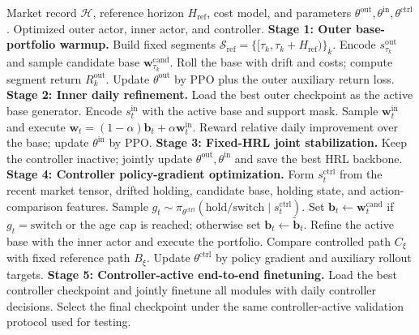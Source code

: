 \documentclass[letterpaper]{article} %
\newcommand{\algsmall}{\footnotesize}
\begin{document}
\begin{algorithm}[t]
\caption{End-to-End Staged Training of \textit{CMTFlow}}
\label{alg:cmtflow_training}
\algsmall
\begin{algorithmic}[1]
\REQUIRE Market record \(\mathcal{H}\), reference horizon \(H_{\mathrm{ref}}\), cost model, and parameters \(\theta^{\mathrm{out}},\theta^{\mathrm{in}},\theta^{\mathrm{ctrl}}\).
\ENSURE Optimized outer actor, inner actor, and controller.
\STATE \textbf{Stage 1: Outer base-portfolio warmup.}
\STATE Build fixed segments \(\mathcal{S}_{\mathrm{ref}}=\{[\tau_k,\tau_k+H_{\mathrm{ref}})\}_k\).
\STATE Encode \(s^{\mathrm{out}}_{\tau_k}\) and sample candidate base \(\mathbf{w}^{\mathrm{cand}}_{\tau_k}\).
\STATE Roll the base with drift and costs; compute segment return \(R^{\mathrm{out}}_k\).
\STATE Update \(\theta^{\mathrm{out}}\) by PPO plus the outer auxiliary return loss.
\ENDFOR
\STATE \textbf{Stage 2: Inner daily refinement.}
\STATE Load the best outer checkpoint as the active base generator.
\STATE Encode \(s^{\mathrm{in}}_t\) with the active base and support mask.
\STATE Sample \(\mathbf{w}^{\mathrm{in}}_t\) and execute \(\mathbf{w}_t=(1-\alpha)\mathbf{b}_t+\alpha\mathbf{w}^{\mathrm{in}}_t\).
\STATE Reward relative daily improvement over the base; update \(\theta^{\mathrm{in}}\) by PPO.
\ENDFOR
\STATE \textbf{Stage 3: Fixed-HRL joint stabilization.}
\STATE Keep the controller inactive; jointly update \(\theta^{\mathrm{out}},\theta^{\mathrm{in}}\) and save the best HRL backbone.
\STATE \textbf{Stage 4: Controller policy-gradient optimization.}
\STATE Form \(s_t^{\mathrm{ctrl}}\) from the recent market tensor, drifted holding, candidate base, holding state, and action-comparison features.
\STATE Sample \(g_t\sim\pi_{\theta^{\mathrm{ctrl}}}(\mathrm{hold/switch}\mid s^{\mathrm{ctrl}}_t)\).
\STATE Set \(\mathbf{b}_t\leftarrow\mathbf{w}_t^{\mathrm{cand}}\) if \(g_t=\mathrm{switch}\) or the age cap is reached; otherwise set \(\mathbf{b}_t\leftarrow\tilde{\mathbf{b}}_t\).
\STATE Refine the active base with the inner actor and execute the portfolio.
\ENDFOR
\STATE Compare controlled path \(C_\xi\) with fixed reference path \(B_\xi\).
\STATE Update \(\theta^{\mathrm{ctrl}}\) by policy gradient and auxiliary rollout targets. 
\ENDFOR
\STATE \textbf{Stage 5: Controller-active end-to-end finetuning.}
\STATE Load the best controller checkpoint and jointly finetune all modules with daily controller decisions.
\STATE Select the final checkpoint under the same controller-active validation protocol used for testing.
\end{algorithmic}
\end{algorithm}
\end{document}
